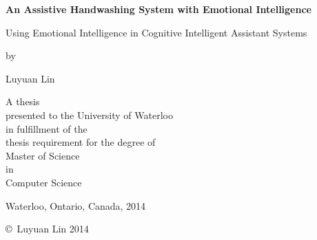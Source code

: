 
\pagestyle{empty}

\begin{titlepage}
        \begin{center}
        \vspace*{0.6cm}

        \Huge
        {\bf An Assistive Handwashing System with Emotional Intelligence }
        
        \vspace*{0.4cm}
        \LARGE
        Using Emotional Intelligence in Cognitive Intelligent Assistant Systems
        
        \vspace*{0.8cm}

        \normalsize
        by \\

        \vspace*{0.8cm}

        \Large
        Luyuan Lin \\

        \vspace*{2.8cm}

        \normalsize
        A thesis \\
        presented to the University of Waterloo \\ 
        in fulfillment of the \\
        thesis requirement for the degree of \\
        Master of Science \\
        in \\
        Computer Science \\

        \vspace*{1.6cm}

        Waterloo, Ontario, Canada, 2014 \\

        \vspace*{0.8cm}

        \copyright\ Luyuan Lin 2014 \\
        \end{center}
\end{titlepage}

